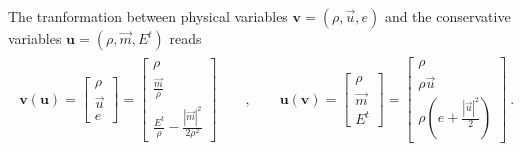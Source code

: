 \documentclass[letterpaper,10pt,english]{jupyterBook}
\begin{document}
\sphinxAtStartPar
{} The tranformation between physical variables \(\mathbf{v} = (\rho, \vec{u}, e)\) and the conservative variables \(\mathbf{u} = ( \rho, \vec{m}, E^t )\) reads
\begin{equation*}
\begin{split}\begin{aligned}
\mathbf{v}(\mathbf{u}) = \begin{bmatrix} \rho \\ \vec{u} \\ e \end{bmatrix} = \begin{bmatrix} \rho \\ \frac{\vec{m}}{\rho} \\ \frac{E^t}{\rho} - \frac{|\vec{m}|^2}{2 \rho^2} \end{bmatrix}
\qquad , \qquad
\mathbf{u}(\mathbf{v}) = \begin{bmatrix} \rho \\ \vec{m} \\ E^t \end{bmatrix} = \begin{bmatrix} \rho \\ \rho \vec{u} \\ \rho \left( e + \frac{|\vec{u}|^2}{2} \right) \end{bmatrix} \ .
\end{aligned}\end{split}
\end{equation*}
\sphinxAtStartPar
{}
\end{document}
